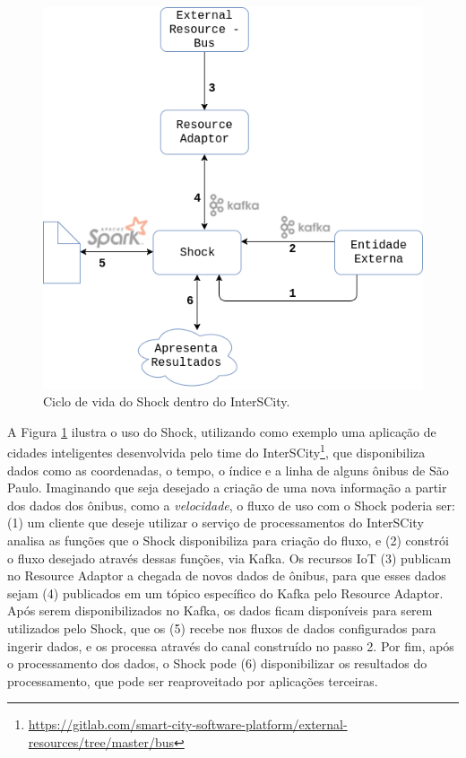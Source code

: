 \pagebreak

\begin{figure}[hbt]
  \centering
    \includegraphics[scale=0.45]{figuras/shock.png}
    \caption{Ciclo de vida do Shock dentro do InterSCity.}
  \label{fig:shock}
\end{figure}

A Figura \ref{fig:shock} ilustra o uso do Shock, utilizando como exemplo uma
aplicação de cidades inteligentes desenvolvida pelo time do
InterSCity\footnote{\url{https://gitlab.com/smart-city-software-platform/external-resources/tree/master/bus}},
que disponibiliza dados como as coordenadas, o tempo, o índice e a linha de
alguns ônibus de São Paulo. Imaginando que seja desejado a criação de uma nova
informação a partir dos dados dos ônibus, como a \textit{velocidade}, o fluxo
de uso com o Shock poderia ser: (1) um cliente que deseje utilizar o serviço
de processamentos do InterSCity analisa as funções que o Shock disponibiliza
para criação do fluxo, e (2) constrói o fluxo desejado através
dessas funções, via Kafka. Os recursos IoT (3) publicam no Resource Adaptor a
chegada de novos dados de ônibus, para que esses dados sejam (4) publicados em
um tópico específico do Kafka pelo Resource Adaptor. Após serem disponibilizados
no Kafka, os dados ficam disponíveis para serem utilizados pelo Shock, que os (5)
recebe nos fluxos de dados configurados para ingerir dados, e os processa
através do canal construído no passo 2. Por fim, após o
processamento dos dados, o Shock pode (6) disponibilizar os resultados do
processamento, que pode ser reaproveitado por aplicações terceiras.

